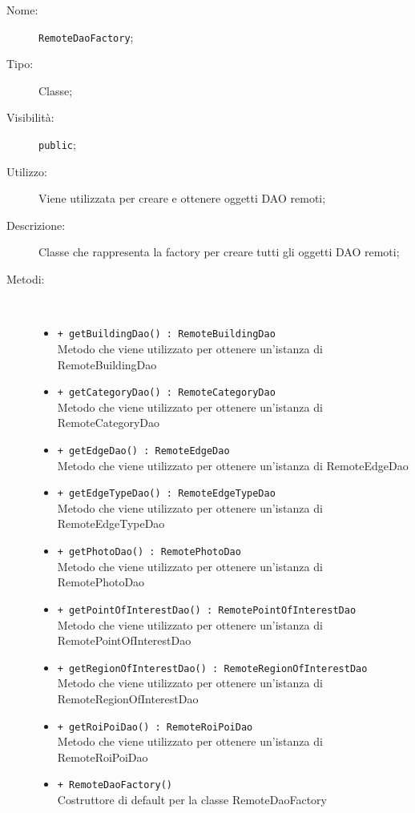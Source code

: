 \documentclass[../DefinizioneDiProdotto.tex]{subfiles}
\begin{document}
    \begin{description}
\item[Nome:] \texttt{RemoteDaoFactory};
\item[Tipo:] Classe;
\item[Visibilità:] \texttt{public};
\item[Utilizzo:] Viene utilizzata per creare e ottenere oggetti DAO remoti;
\item[Descrizione:] Classe che rappresenta la factory per creare tutti gli oggetti DAO remoti;
\item[Metodi:] \
\begin{itemize}
\item \texttt{+ getBuildingDao() : RemoteBuildingDao}\\
Metodo che viene utilizzato per ottenere un'istanza di RemoteBuildingDao
 \item \texttt{+ getCategoryDao() : RemoteCategoryDao}\\
Metodo che viene utilizzato per ottenere un'istanza di RemoteCategoryDao
 \item \texttt{+ getEdgeDao() : RemoteEdgeDao}\\
Metodo che viene utilizzato per ottenere un'istanza di RemoteEdgeDao
 \item \texttt{+ getEdgeTypeDao() : RemoteEdgeTypeDao}\\
Metodo che viene utilizzato per ottenere un'istanza di RemoteEdgeTypeDao
 \item \texttt{+ getPhotoDao() : RemotePhotoDao}\\
Metodo che viene utilizzato per ottenere un'istanza di RemotePhotoDao
 \item \texttt{+ getPointOfInterestDao() : RemotePointOfInterestDao}\\
Metodo che viene utilizzato per ottenere un'istanza di RemotePointOfInterestDao
 \item \texttt{+ getRegionOfInterestDao() : RemoteRegionOfInterestDao}\\
Metodo che viene utilizzato per ottenere un'istanza di RemoteRegionOfInterestDao
 \item \texttt{+ getRoiPoiDao() : RemoteRoiPoiDao}\\
Metodo che viene utilizzato per ottenere un'istanza di RemoteRoiPoiDao
 \item \texttt{+ RemoteDaoFactory()}\\
Costruttore di default per la classe RemoteDaoFactory
 \end{itemize}
\end{description}
\end{document}
